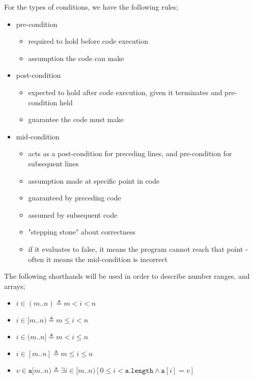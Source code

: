 \documentclass[a4paper, 12pt]{article}
\begin{document}
            For the types of conditions, we have the following rules;
            \begin{itemize}
                \itemsep0em
                \item pre-condition
                    \begin{itemize}
                        \itemsep0em
                        \item required to hold before code execution
                        \item assumption the code can make
                    \end{itemize}
                \item post-condition
                    \begin{itemize}
                        \itemsep0em
                        \item expected to hold after code execution, given it terminates and pre-condition held
                        \item guarantee the code must make
                    \end{itemize}
                \item mid-condition
                    \begin{itemize}
                        \itemsep0em
                        \item acts as a post-condition for preceding lines, and pre-condition for subsequent lines
                        \item assumption made at specific point in code
                        \item guaranteed by preceding code
                        \item assumed by subsequent code
                        \item "stepping stone" about correctness
                        \item if it evaluates to false, it means the program cannot reach that point - often it means the mid-condition is incorrect
                    \end{itemize}
            \end{itemize}
            The following shorthands will be used in order to describe number ranges, and arrays;
            \begin{itemize}
                \itemsep0em
                \item $i \in (m..n) \triangleq m < i < n$
                \item $i \in [m..n) \triangleq m \leq i < n$
                \item $i \in (m..n] \triangleq m < i \leq n$
                \item $i \in [m..n] \triangleq m \leq i \leq n$
                \item $v \in \texttt{a}[m..n) \triangleq \exists i \in [m..n) [0 \leq i < \texttt{a.length} \land \texttt{a}[i] = v]$
            \end{itemize}
\end{document}
